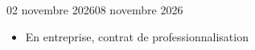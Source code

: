 \documentclass[12pt]{fiche-rd-info}
\begin{document}

\begin{fichesuivi}{02 novembre 2026}{08 novembre 2026}
	\begin{travaileffectue}
		\begin{itemize}
			\item En entreprise, contrat de professionnalisation
		\end{itemize}
	\end{travaileffectue}
\end{fichesuivi}
\end{document}
